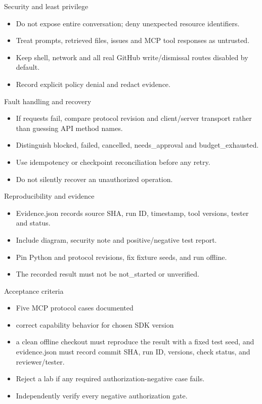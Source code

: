 \documentclass[aspectratio=169,10pt]{beamer}
\begin{document}
\begin{frame}{Security and least privilege}
\small
\begin{itemize}
\item Do not expose entire conversation; deny unexpected resource identifiers.
\item Treat prompts, retrieved files, issues and MCP tool responses as untrusted.
\item Keep shell, network and all real GitHub write/dismissal routes disabled by default.
\item Record explicit policy denial and redact evidence.
\end{itemize}

\end{frame}

\begin{frame}{Fault handling and recovery}
\small
\begin{itemize}
\item If requests fail, compare protocol revision and client/server transport rather than guessing API method names.
\item Distinguish blocked, failed, cancelled, needs\_approval and budget\_exhausted.
\item Use idempotency or checkpoint reconciliation before any retry.
\item Do not silently recover an unauthorized operation.
\end{itemize}

\end{frame}

\begin{frame}{Reproducibility and evidence}
\small
\begin{itemize}
\item Evidence.json records source SHA, run ID, timestamp, tool versions, tester and status.
\item Include diagram, security note and positive/negative test report.
\item Pin Python and protocol revisions, fix fixture seeds, and run offline.
\item The recorded result must not be not\_started or unverified.
\end{itemize}

\end{frame}

\begin{frame}{Acceptance criteria}
\small
\begin{itemize}
\item Five MCP protocol cases documented
\item correct capability behavior for chosen SDK version
\item a clean offline checkout must reproduce the result with a fixed test seed, and evidence.json must record commit SHA, run ID, versions, check status, and reviewer/tester.
\item Reject a lab if any required authorization-negative case fails.
\item Independently verify every negative authorization gate.
\end{itemize}

\end{frame}
\end{document}
